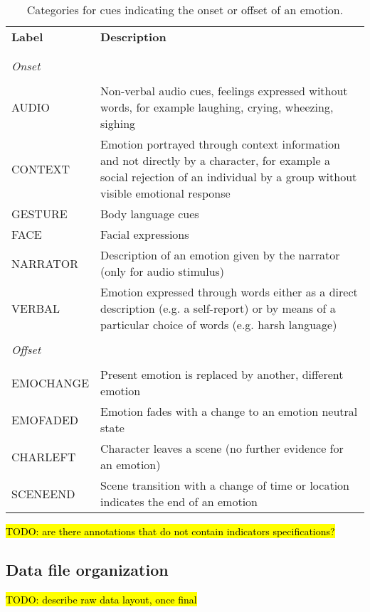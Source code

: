 \begin{table}
  \centering
  \begin{tabular}{lp{10cm}}
    \textbf{Label} & \textbf{Description} \\
    \\\hline\\
    \textit{Onset}\\\\
    AUDIO & Non-verbal audio cues, feelings expressed without words, for example laughing, crying, wheezing, sighing\\
    CONTEXT & Emotion portrayed through context information and not directly by a character, for example a social rejection of an individual by a group without visible emotional response\\
    GESTURE & Body language cues \\
    FACE & Facial expressions \\
    NARRATOR & Description of an emotion given by the narrator (only for audio stimulus)\\
    VERBAL & Emotion expressed through words either as a direct description (e.g. a self-report) or by means of a particular choice of words (e.g. harsh language)\\
    \\
    \textit{Offset}\\\\
    EMOCHANGE & Present emotion is replaced by another, different emotion \\
    EMOFADED & Emotion fades with a change to an emotion neutral state \\
    CHARLEFT & Character leaves a scene (no further evidence for an emotion)\\
    SCENEEND & Scene transition with a change of time or location indicates the end of an emotion\\

  \end{tabular}
  \caption{Categories for cues indicating the onset or offset of an emotion.}
  \label{tab:onoffset_indicators}
\end{table}

\hl{TODO: are there annotations that do not contain indicators specifications?}

\subsection*{Data file organization}

\hl{TODO: describe raw data layout, once final}

